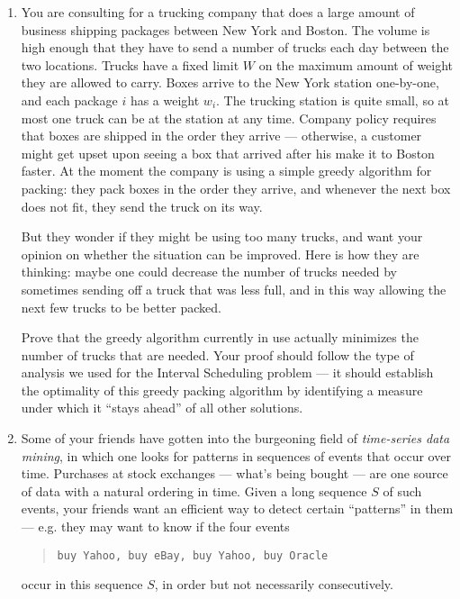 \documentclass[12pt]{article}
\begin{document}
\begin{enumerate}


\item 

You are consulting for a trucking company that does a large 
amount of business shipping packages between New York and Boston.
The volume is high enough that they have to send
a number of trucks each day between the two locations. Trucks have a
fixed limit $W$ on the maximum amount of weight they are allowed to carry.
Boxes arrive to the New York station one-by-one, and each package $i$ has
a weight $w_i$. The trucking station is quite small, so at most one truck
can be at the station at any time. Company policy requires that boxes
are shipped in the order they arrive --- otherwise, a customer might
get upset upon seeing a box that arrived after his make it to Boston faster.
At the moment the company is using a simple greedy algorithm for packing:
they pack boxes in the order they arrive, 
and whenever the next box does not fit, they send the truck on its way. 

But they wonder if they might be using too many
trucks, and want your opinion on whether the situation can be
improved. Here is how they are thinking: maybe one could decrease the number
of trucks needed by sometimes sending off a truck that was less full,
and in this way allowing the next few trucks to be better packed.

Prove that the greedy algorithm currently in use actually minimizes the
number of trucks that are needed.  Your proof should follow the type of
analysis we used for the Interval Scheduling problem --- it should
establish the optimality of this greedy packing algorithm
by identifying a measure under which it ``stays ahead''
of all other solutions.


\item 

Some of your friends have gotten into the
burgeoning field of {\em time-series data mining},
in which one looks for patterns in sequences of
events that occur over time.
Purchases at stock exchanges --- what's
being bought --- are one source
of data with a natural ordering in time.
Given a long sequence $S$ of such events, your friends
want an efficient way to detect certain
``patterns'' in them --- e.g. they may want
to know if the four events
\begin{quote}
{\tt buy Yahoo, buy eBay, buy Yahoo, buy Oracle}
\end{quote}
occur in this sequence $S$, in order but not necessarily consecutively.


\end{enumerate}
\end{document}
